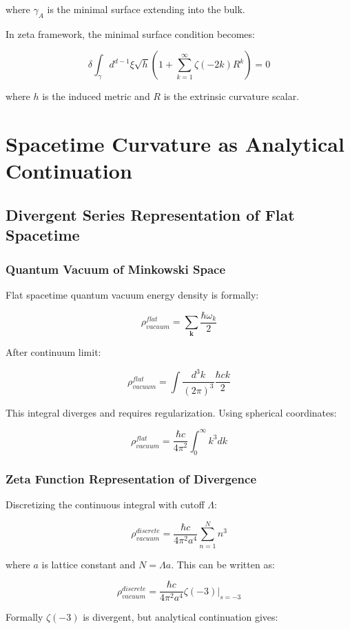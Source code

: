 \documentclass[12pt,a4paper]{article}
\begin{document}
where $\gamma_A$ is the minimal surface extending into the bulk.

In zeta framework, the minimal surface condition becomes:

$$\delta \int_{\gamma} d^{d-1}\xi \sqrt{h} \left(1 + \sum_{k=1}^{\infty} \zeta(-2k) R^k\right) = 0$$

where $h$ is the induced metric and $R$ is the extrinsic curvature scalar.

\section{Spacetime Curvature as Analytical Continuation}

\subsection{Divergent Series Representation of Flat Spacetime}

\subsubsection{Quantum Vacuum of Minkowski Space}

Flat spacetime quantum vacuum energy density is formally:

$$\rho_{vacuum}^{flat} = \sum_{\mathbf{k}} \frac{\hbar \omega_k}{2}$$

After continuum limit:

$$\rho_{vacuum}^{flat} = \int \frac{d^3k}{(2\pi)^3} \frac{\hbar c k}{2}$$

This integral diverges and requires regularization. Using spherical coordinates:

$$\rho_{vacuum}^{flat} = \frac{\hbar c}{4\pi^2} \int_0^\infty k^3 dk$$

\subsubsection{Zeta Function Representation of Divergence}

Discretizing the continuous integral with cutoff $\Lambda$:

$$\rho_{vacuum}^{discrete} = \frac{\hbar c}{4\pi^2 a^4} \sum_{n=1}^{N} n^3$$

where $a$ is lattice constant and $N = \Lambda a$. This can be written as:

$$\rho_{vacuum}^{discrete} = \frac{\hbar c}{4\pi^2 a^4} \zeta(-3)|_{s=-3}$$

Formally $\zeta(-3)$ is divergent, but analytical continuation gives:
\end{document}
